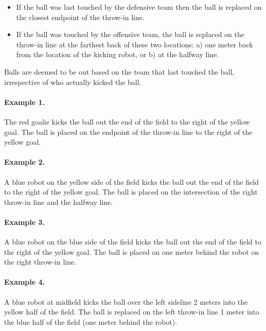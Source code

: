 \documentclass[12pt]{article}
\begin{document}
\begin{itemize}

\item If the ball was last touched by the defensive team then the ball is replaced on the closest endpoint of the throw-in line.

\item If the ball was touched by the offensive team, the ball is replaced on
the throw-in line at the farthest back of these two locations: a) one
meter back from the location of the kicking robot, or b) at the halfway
line.


\end{itemize}

Balls are deemed to be out based on the team that last touched the ball, irrespective of who actually kicked the ball.

\paragraph{Example 1.} The red goalie kicks the ball out the end of the field to the right of the yellow goal. The ball is placed on the endpoint of the throw-in line to the right of the yellow goal.

\paragraph{Example 2.} A blue robot on the yellow side of the field kicks the ball out the end of the field to the right of the yellow goal. The ball is placed on the intersection of the right throw-in line and the halfway line.

\paragraph{Example 3.} A blue robot on the blue side of the field kicks the ball out the end of the field to the right of the yellow goal. The ball is placed on one meter behind the robot on the right throw-in line.

\paragraph{Example 4.} A blue robot at midfield kicks the ball over the left sideline 2 meters into the yellow half of the field. The ball is replaced on the left throw-in line 1 meter into the blue half of the field (one meter behind the robot).
\end{document}
